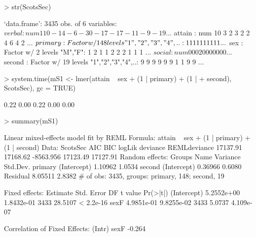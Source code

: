 \documentclass[12pt]{article}
\begin{document}
\begin{Schunk}
\begin{Sinput}
> str(ScotsSec)
\end{Sinput}
\begin{Soutput}
`data.frame':	3435 obs. of  6 variables:
 $ verbal : num  11 0 -14 -6 -30 -17 -17 -11 -9 -19 ...
 $ attain : num  10 3 2 3 2 2 4 6 4 2 ...
 $ primary: Factor w/ 148 levels "1","2","3","4",..: 1 1 1 1 1 1 1 1 1 1 ...
 $ sex    : Factor w/ 2 levels "M","F": 1 2 1 1 2 2 2 1 1 1 ...
 $ social : num  0 0 0 20 0 0 0 0 0 0 ...
 $ second : Factor w/ 19 levels "1","2","3","4",..: 9 9 9 9 9 9 1 1 9 9 ...
\end{Soutput}
\begin{Sinput}
> system.time(mS1 <- lmer(attain ~ sex + (1 | primary) + (1 | 
+     second), ScotsSec), gc = TRUE)
\end{Sinput}
\begin{Soutput}
[1] 0.22 0.00 0.22 0.00 0.00
\end{Soutput}
\begin{Sinput}
> summary(mS1)
\end{Sinput}
\begin{Soutput}
Linear mixed-effects model fit by REML
Formula: attain ~ sex + (1 | primary) + (1 | second) 
   Data: ScotsSec 
      AIC      BIC    logLik deviance REMLdeviance
 17137.91 17168.62 -8563.956 17123.49     17127.91
Random effects:
 Groups   Name        Variance Std.Dev.
 primary  (Intercept) 1.10962  1.0534  
 second   (Intercept) 0.36966  0.6080  
 Residual             8.05511  2.8382  
# of obs: 3435, groups: primary, 148; second, 19

Fixed effects:
              Estimate Std. Error   DF t value  Pr(>|t|)
(Intercept) 5.2552e+00 1.8432e-01 3433 28.5107 < 2.2e-16
sexF        4.9851e-01 9.8255e-02 3433  5.0737 4.109e-07

Correlation of Fixed Effects:
     (Intr)
sexF -0.264
\end{Soutput}
\end{Schunk}
\end{document}
